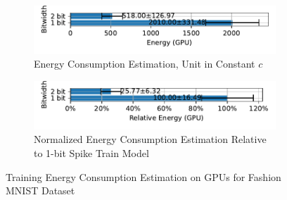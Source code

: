         \begin{figure}[H]
            \centering
            \begin{subfigure}[H]{0.48\textwidth}
                \includegraphics[width=\textwidth]{../timesteps/FashionMNIST/plots/fashionmnist_train_energy_gpu.pdf}
                \caption{Energy Consumption Estimation, Unit in Constant $c$}
            \end{subfigure}
            \hfill
            \begin{subfigure}[H]{0.48\textwidth}
                \includegraphics[width=\textwidth]{../timesteps/FashionMNIST/plots/fashionmnist_train_relative_energy_gpu.pdf}
                \caption{Normalized Energy Consumption Estimation Relative to 1-bit Spike Train Model}
            \end{subfigure}
            \caption{Training Energy Consumption Estimation on GPUs for Fashion MNIST Dataset}
        \end{figure}

